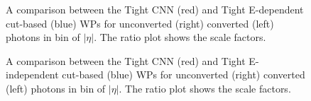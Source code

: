\begin{figure}[htbp]
    \centering
    \caption{A comparison between the Tight CNN (red) and Tight E-dependent cut-based  (blue) WPs for unconverted (right) converted (left) photons in bin of $|\eta|$. The ratio plot shows the scale factors.}
    \label{Eff:Tight:Dep}
\end{figure}
\begin{figure}[htbp]
    \centering
    \caption{A comparison between the Tight CNN (red) and Tight E-independent cut-based  (blue) WPs for unconverted (right) converted (left) photons in bin of $|\eta|$. The ratio plot shows the scale factors.}
    \label{Eff:Tight:Inc}
\end{figure}

